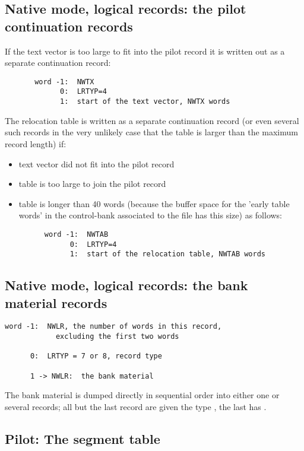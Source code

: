 \subsection{Native mode, logical records: the pilot continuation records}

If the text vector is too large to fit into the pilot record
it is written out as a separate  continuation record:

\begin{verbatim}
       word -1:  NWTX
             0:  LRTYP=4
             1:  start of the text vector, NWTX words
\end{verbatim}

The relocation table is written as a separate  continuation
record (or even several such records in the very unlikely case
that the table is larger than the maximum record length) if:

\begin{itemize}
\item text vector did not fit into the pilot record
\item table is too large to join the pilot record
\item table is longer than 40 words (because the buffer space for
      the 'early table words' in the control-bank associated to the
      file has this size) as follows:
\begin{verbatim}
      word -1:  NWTAB
            0:  LRTYP=4
            1:  start of the relocation table, NWTAB words
\end{verbatim}
\end{itemize}

\subsection*{Native mode, logical records: the bank material records}

\begin{verbatim}
word -1:  NWLR, the number of words in this record,
            excluding the first two words

      0:  LRTYP = 7 or 8, record type

      1 -> NWLR:  the bank material
\end{verbatim}

The bank material is dumped directly in sequential order
into either one or several records;
all but the last record are given the type ,
the last has .

\subsection*{Pilot: The segment table}

